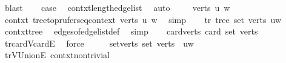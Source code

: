 \begin{isabellebody}
\ blast\isanewline
\ \ \isamarkupfalse%
\ {\isacharquery}{\kern0pt}case\ \isamarkupfalse%
\ contxt{\isachardot}{\kern0pt}length{\isacharunderscore}{\kern0pt}edge{\isacharunderscore}{\kern0pt}list\ \isamarkupfalse%
\ auto\isanewline
{}\isamarkupfalse%
\isanewline
\ \ \isamarkupfalse%
\ {\isacharparenleft}{\kern0pt}{}\ verts\ u\ w{\isacharparenright}{\kern0pt}\isanewline
\ \ \isamarkupfalse%
\ \isamarkupfalse%
\ contxt{\isacharcolon}{\kern0pt}\ tree{\isacharunderscore}{\kern0pt}to{\isacharunderscore}{\kern0pt}prufer{\isacharunderscore}{\kern0pt}seq{\isacharunderscore}{\kern0pt}context\ verts\ {\isachardoublequoteopen}{\isacharbrackleft}{\kern0pt}{\isacharparenleft}{\kern0pt}u{\isacharcomma}{\kern0pt}\ w{\isacharparenright}{\kern0pt}{\isacharbrackright}{\kern0pt}{\isachardoublequoteclose}\ \isamarkupfalse%
\ simp\isanewline
\ \ \isamarkupfalse%
\ tr{\isacharcolon}{\kern0pt}\ tree\ {\isachardoublequoteopen}set\ verts{\isachardoublequoteclose}\ {\isachardoublequoteopen}{\isacharbraceleft}{\kern0pt}{\isacharbraceleft}{\kern0pt}u{\isacharcomma}{\kern0pt}w{\isacharbraceright}{\kern0pt}{\isacharbraceright}{\kern0pt}{\isachardoublequoteclose}\ \isamarkupfalse%
\ contxt{\isachardot}{\kern0pt}tree\ \isamarkupfalse%
\ edges{\isacharunderscore}{\kern0pt}of{\isacharunderscore}{\kern0pt}edge{\isacharunderscore}{\kern0pt}list{\isacharunderscore}{\kern0pt}def\ \isamarkupfalse%
\ simp\isanewline
\ \ \isamarkupfalse%
\ card{\isacharunderscore}{\kern0pt}verts{\isacharcolon}{\kern0pt}\ {\isachardoublequoteopen}card\ {\isacharparenleft}{\kern0pt}set\ verts{\isacharparenright}{\kern0pt}\ {\isacharequal}{\kern0pt}\ {}{\isachardoublequoteclose}\ \isamarkupfalse%
\ tr{\isachardot}{\kern0pt}card{\isacharunderscore}{\kern0pt}V{\isacharunderscore}{\kern0pt}card{\isacharunderscore}{\kern0pt}E\ \isamarkupfalse%
\ force\isanewline
\ \ \isamarkupfalse%
\ \isamarkupfalse%
\ set{\isacharunderscore}{\kern0pt}verts{\isacharcolon}{\kern0pt}\ {\isachardoublequoteopen}set\ verts\ {\isacharequal}{\kern0pt}\ {\isacharbraceleft}{\kern0pt}u{\isacharcomma}{\kern0pt}w{\isacharbraceright}{\kern0pt}{\isachardoublequoteclose}\ \isamarkupfalse%
\ tr{\isachardot}{\kern0pt}V{\isacharunderscore}{\kern0pt}Union{\isacharunderscore}{\kern0pt}E\ contxt{\isachardot}{\kern0pt}non{\isacharunderscore}{\kern0pt}trivial\ \isamarkupfalse%

\end{isabellebody}
